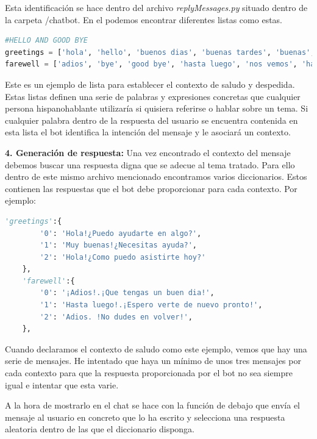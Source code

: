 Esta identificación se hace dentro del archivo \textit{replyMessages.py} situado dentro de la carpeta /chatbot. En el podemos encontrar diferentes listas como estas.

\begin{lstlisting}[language=Python]
#HELLO AND GOOD BYE
greetings = ['hola', 'hello', 'buenos dias', 'buenas tardes', 'buenas', 'saludos', 'hi', 'good']
farewell = ['adios', 'bye', 'good bye', 'hasta luego', 'nos vemos', 'hasta pronto', 'buenas noches', 'que tengas un buen dia', 'hasta la proxima','que vaya bien']

\end{lstlisting}

Este es un ejemplo de lista para establecer el contexto de saludo y despedida. Estas listas definen una serie de palabras y expresiones concretas que cualquier persona hispanohablante utilizaría si quisiera referirse o hablar sobre un tema. Si cualquier palabra dentro de la respuesta del usuario se encuentra contenida en esta lista el bot identifica la intención del mensaje y le asociará un contexto.\vspace{0.3cm}

\textbf{4. Generación de respuesta: }Una vez encontrado el contexto del mensaje debemos buscar una respuesta digna que se adecue al tema tratado. Para ello dentro de este mismo archivo mencionado encontramos varios diccionarios. Estos contienen las respuestas que el bot debe proporcionar para cada contexto. Por ejemplo:

\begin{lstlisting}[language=Python]
    'greetings':{
        '0': 'Hola!¿Puedo ayudarte en algo?',
        '1': 'Muy buenas!¿Necesitas ayuda?',
        '2': 'Hola!¿Como puedo asistirte hoy?'
    },
    'farewell':{
        '0': '¡Adios!.¡Que tengas un buen dia!',
        '1': 'Hasta luego!.¡Espero verte de nuevo pronto!',
        '2': 'Adios. !No dudes en volver!',
    },
\end{lstlisting}

Cuando declaramos el contexto de saludo como este ejemplo, vemos que hay una serie de mensajes. He intentado que haya un mínimo de unos tres mensajes por cada contexto para que la respuesta proporcionada por el bot no sea siempre igual e intentar que esta varie. \vspace{0.1cm}

A la hora de mostrarlo en el chat se hace con la función de debajo que envía el mensaje al usuario en concreto que lo ha escrito y selecciona una respuesta aleatoria dentro de las que el diccionario disponga.\vspace{0.3cm}

